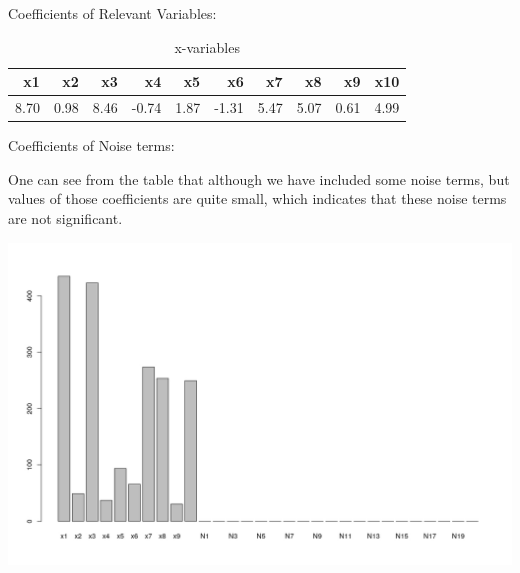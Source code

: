 \documentclass{article}
\begin{document}
\vspace{3mm}
\noindent

Coefficients of Relevant Variables:
\begin{table}[ht]
\centering
\caption{x-variables}
\begin{tabular}{r|r|r|r|r|r|r|r|r|r}
  \hline
 x1 & x2 & x3 & x4 & x5 & x6 & x7 & x8 & x9 & x10 \\
  \hline
8.70 & 0.98 & 8.46 & -0.74 & 1.87 & -1.31 & 5.47 & 5.07 & 0.61 & 4.99 \\
   \hline
\end{tabular}\label{Table:7}
\end{table}

\noindent
Coefficients of Noise terms:
\begin{table}[ht]
\centering
\caption{n-Noise terms}
\label{Table:8}
\end{table}

\noindent
One can see from the table that although we have included some noise terms, but values of those coefficients are quite small, which indicates that these noise terms are not significant.

\includegraphics{barplot}



\end{document}
